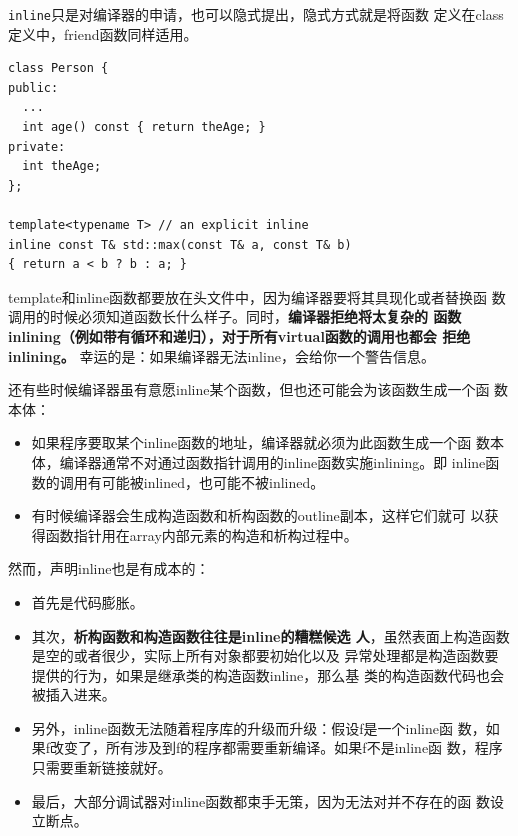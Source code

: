 \texttt{inline}只是对编译器的申请，也可以隐式提出，隐式方式就是将函数
定义在class定义中，friend函数同样适用。
\begin{verbatim}
class Person {
public:
  ...
  int age() const { return theAge; }
private:
  int theAge;
};

template<typename T> // an explicit inline
inline const T& std::max(const T& a, const T& b)
{ return a < b ? b : a; } 
\end{verbatim}

template和inline函数都要放在头文件中，因为编译器要将其具现化或者替换函
数调用的时候必须知道函数长什么样子。同时，\textbf{编译器拒绝将太复杂的
  函数inlining（例如带有循环和递归），对于所有virtual函数的调用也都会
  拒绝inlining。} 幸运的是：如果编译器无法inline，会给你一个警告信息。

还有些时候编译器虽有意愿inline某个函数，但也还可能会为该函数生成一个函
数本体：
\begin{itemize}
\item 如果程序要取某个inline函数的地址，编译器就必须为此函数生成一个函
  数本体，编译器通常不对通过函数指针调用的inline函数实施inlining。即
  inline函数的调用有可能被inlined，也可能不被inlined。
\item 有时候编译器会生成构造函数和析构函数的outline副本，这样它们就可
  以获得函数指针用在array内部元素的构造和析构过程中。
\end{itemize}

然而，声明inline也是有成本的：
\begin{itemize}
\item 首先是代码膨胀。
\item 其次，\textbf{析构函数和构造函数往往是inline的糟糕候选
  人}，虽然表面上构造函数是空的或者很少，实际上所有对象都要初始化以及
异常处理都是构造函数要提供的行为，如果是继承类的构造函数inline，那么基
类的构造函数代码也会被插入进来。
\item 另外，inline函数无法随着程序库的升级而升级：假设f是一个inline函
  数，如果f改变了，所有涉及到f的程序都需要重新编译。如果f不是inline函
  数，程序只需要重新链接就好。
\item 最后，大部分调试器对inline函数都束手无策，因为无法对并不存在的函
  数设立断点。
\end{itemize}

